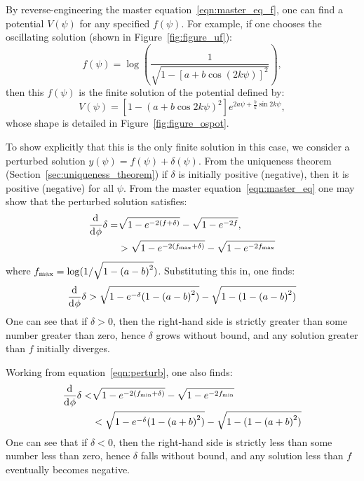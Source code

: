 By reverse-engineering the master equation~\eqref{eqn:master_eq_f}, one can find a potential $V(\psi)$ for any specified $f(\psi)$. For example, if one chooses the oscillating solution (shown in Figure~\ref{fig:figure_uf}):
%
\begin{equation}
  f(\psi) = \log\left( \frac{1}{\sqrt{1-{[a+b\cos(2k\psi)]}^2}}\right),
  \label{eqn:uf_example}
\end{equation}
%
then this $f(\psi)$ is the finite solution of the potential defined by:
%
\begin{equation}
	V(\psi)
    =
    \left[ 1-{(a+b \cos2k\psi)}^2 \right]
    e^{2 a \psi +\frac{b}{k} \sin 2k\psi},
    \label{eqn:Vphi_uf_example}
\end{equation}
whose shape is detailed in Figure~\ref{fig:figure_ospot}.
%

To show explicitly that this is the only finite solution in this case, we consider a perturbed solution $y(\psi) = f(\psi)+\delta(\psi)$.  From the uniqueness theorem (Section~\ref{sec:uniqueness_theorem}) if $\delta$ is initially positive (negative), then it is positive (negative) for all $\psi$. From the master equation~\eqref{eqn:master_eq} one may show that the perturbed solution satisfies:
%
\begin{align}
  \frac{\operatorname{d}^{}\!{}}{\operatorname{d}^{}\!{\phi}}\delta 
  =& 
  \sqrt{1-e^{-2(f+\delta)}} -\sqrt{1-e^{-2f}}, 
  \label{eqn:perturb}
  \\
  &>
  \sqrt{1-e^{-2(f_\mathrm{max}+\delta)}} -\sqrt{1-e^{-2f_\mathrm{max}}}
\end{align}
%
where $f_\mathrm{max} = \log(1/\sqrt{1-{(a-b)}^2})$. Substituting this in, one finds:
%
\begin{align}
  \frac{\operatorname{d}^{}\!{}}{\operatorname{d}^{}\!{\phi}}\delta 
  > 
  \sqrt{1-e^{-\delta}({1-{(a-b)}^2})} - \sqrt{1-({1-{(a-b)}^2})}
\end{align}
%
One can see that if $\delta>0$, then the right-hand side is strictly greater than some number greater than zero, hence $\delta$ grows without bound, and any solution greater than $f$ initially diverges. 

Working from equation~\eqref{eqn:perturb}, one also finds:
%
\begin{align}
  \frac{\operatorname{d}^{}\!{}}{\operatorname{d}^{}\!{\phi}}\delta 
  <&
  \sqrt{1-e^{-2(f_\mathrm{min}+\delta)}} -\sqrt{1-e^{-2f_\mathrm{min}}} 
  \nonumber
  \\
  &<
  \sqrt{1-e^{-\delta}({1-{(a+b)}^2})} - \sqrt{1-({1-{(a+b)}^2})}
\end{align}
%
One can see that if $\delta<0$, then the right-hand side is strictly less than some number less than zero, hence $\delta$ falls without bound, and any solution less than $f$ eventually becomes negative. 

